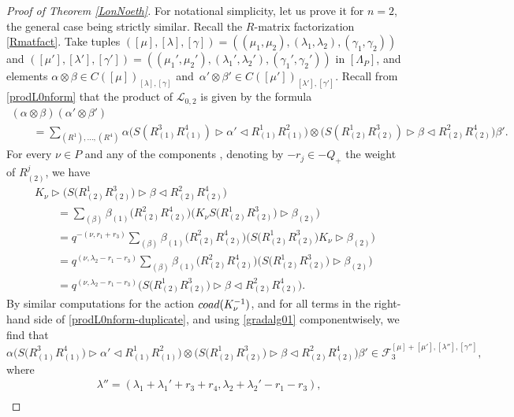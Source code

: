 \documentclass[11pt]{article}
\numberwithin{equation}{section}
\numberwithin{equation}{section}
\theoremstyle{definition}
\newcommand{\Ff}{{\mathcal F}}
\newcommand{\Ll}{{\mathcal L}}
\begin{document}
\begin{proof}[Proof of Theorem \ref{LonNoeth}]
For notational simplicity, let us prove it for $n=2$, the general case being strictly similar. Recall the $R$-matrix factorization \eqref{Rmatfact}. Take tuples $([\mu],[\lambda],[\gamma]) =((\mu_1,\mu_2),(\lambda_1,\lambda_2),(\gamma_1,\gamma_2))$ and $([\mu'],[\lambda'],[\gamma'])=((\mu_1',\mu_2'),(\lambda_1',\lambda_2'),(\gamma_1',\gamma_2'))$ in $[\Lambda_P]$, and elements $\alpha\otimes \beta \in C([\mu])_{[\lambda],[\gamma]}$ and~${\alpha'\otimes \beta'\in C([\mu'])_{[\lambda'],[\gamma']}}$. Recall from \eqref{prodL0nform} that the product of $\Ll_{0,2}$ is given by the formula
\begin{gather}
(\alpha\otimes \beta) (\alpha' \otimes \beta') \nonumber\\
\qquad= \sum_{(R^1),\dots, (R^4)} \alpha \bigl(S(R^3_{(1)}R^4_{(1)})\rhd \alpha' \lhd R^1_{(1)}R^2_{(1)}\bigr)\otimes \bigl( S(R^1_{(2)}R^3_{(2)}) \rhd \beta \lhd R^2_{(2)}R^4_{(2)}\bigr)\beta'.\label{prodL0nform-duplicate}
\end{gather}
For every $\nu\in P$ and any of the components , denoting by $-r_j\in -Q_+$ the weight of $R^j_{(2)}$, we have
\begin{gather*}
K_\nu \rhd \big( S\big(R^1_{(2)}R^3_{(2)}\big) \rhd \beta \lhd R^2_{(2)}R^4_{(2)}\big) \\
 \qquad= \sum_{(\beta)} \beta_{(1)}\big(R^2_{(2)}R^4_{(2)}\big)\big(K_\nu S\big(R^1_{(2)}R^3_{(2)}\big)\rhd \beta_{(2)}\big)\\
 \qquad= q^{-(\nu,r_1+r_3)}\sum_{(\beta)} \beta_{(1)}\big(R^2_{(2)}R^4_{(2)}\big)\big(S\big(R^1_{(2)}R^3_{(2)}\big)K_\nu \rhd \beta_{(2)}\big)\\
 \qquad= q^{(\nu,\lambda_2-r_1-r_3)}\sum_{(\beta)} \beta_{(1)}\bigl(R^2_{(2)}R^4_{(2)}\bigr)\big(S\big(R^1_{(2)}R^3_{(2)}\big)\rhd \beta_{(2)}\big)\\
 \qquad= q^{(\nu,\lambda_2-r_1-r_3)} \big( S\big(R^1_{(2)}R^3_{(2)}\big) \rhd \beta \lhd R^2_{(2)}R^4_{(2)}\big).
\end{gather*}
By similar computations for the action ${\rm coad}(K_\nu^{-1})$, and for all terms in the right-hand side of \eqref{prodL0nform-duplicate}, and using \eqref{gradalg01} componentwisely, we find that
\[\alpha \big(S\big(R^3_{(1)}R^4_{(1)}\big)\rhd \alpha' \lhd R^1_{(1)}R^2_{(1)}\big)\otimes \big( S\big(R^1_{(2)}R^3_{(2)}\big) \rhd \beta \lhd R^2_{(2)}R^4_{(2)}\big)\beta' \in \Ff_3^{[\mu]+[\mu'], [\lambda''],[\gamma'']},\]
where
\begin{align*}
&\lambda'' = (\lambda_1+\lambda_1'+r_3+r_4,\lambda_2+\lambda_2'-r_1-r_3),\\

\end{align*}
\end{proof}
\end{document}
